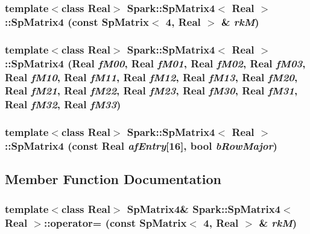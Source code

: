 \subsubsection{\setlength{\rightskip}{0pt plus 5cm}template$<$class Real$>$ {\bf Spark::Sp\-Matrix4}$<$ Real $>$::{\bf Sp\-Matrix4} (const {\bf Sp\-Matrix}$<$ 4, Real $>$ \& {\em rk\-M})}\label{classSpark_1_1SpMatrix4_a2}


\subsubsection{\setlength{\rightskip}{0pt plus 5cm}template$<$class Real$>$ {\bf Spark::Sp\-Matrix4}$<$ Real $>$::{\bf Sp\-Matrix4} (Real {\em f\-M00}, Real {\em f\-M01}, Real {\em f\-M02}, Real {\em f\-M03}, Real {\em f\-M10}, Real {\em f\-M11}, Real {\em f\-M12}, Real {\em f\-M13}, Real {\em f\-M20}, Real {\em f\-M21}, Real {\em f\-M22}, Real {\em f\-M23}, Real {\em f\-M30}, Real {\em f\-M31}, Real {\em f\-M32}, Real {\em f\-M33})}\label{classSpark_1_1SpMatrix4_a3}


\subsubsection{\setlength{\rightskip}{0pt plus 5cm}template$<$class Real$>$ {\bf Spark::Sp\-Matrix4}$<$ Real $>$::{\bf Sp\-Matrix4} (const Real {\em af\-Entry}[16], bool {\em b\-Row\-Major})}\label{classSpark_1_1SpMatrix4_a4}




\subsection{Member Function Documentation}
\subsubsection{\setlength{\rightskip}{0pt plus 5cm}template$<$class Real$>$ {\bf Sp\-Matrix4}\& {\bf Spark::Sp\-Matrix4}$<$ Real $>$::operator= (const {\bf Sp\-Matrix}$<$ 4, Real $>$ \& {\em rk\-M})}\label{classSpark_1_1SpMatrix4_a6}


